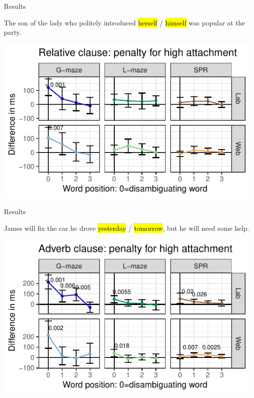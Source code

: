 \documentclass[12pt, xcolor=beamer,table,usenames,dvipsnames, ignorenonframetext, ngerman]{beamer}
\makeatletter
\let\HL\hl
\renewcommand\hl{%
	\let\set@color\beamerorig@set@color
	\let\reset@color\beamerorig@reset@color
	\HL}
\makeatother
\begin{document}
\begin{frame}{Results}
\begin{small}	
The son of the lady who politely introduced \hl{herself} / \hl{himself} was popular at the party.
	
\end{small}
\includegraphics[width=\textwidth]{g_rel.pdf}
\end{frame}

\begin{frame}{Results}
\begin{small}	

James will fix the car he drove \hl{yesterday} / \hl{tomorrow},  but he will need some help.

\end{small}
\includegraphics[width=\textwidth]{g_adv.pdf}
\end{frame}
\end{document}
